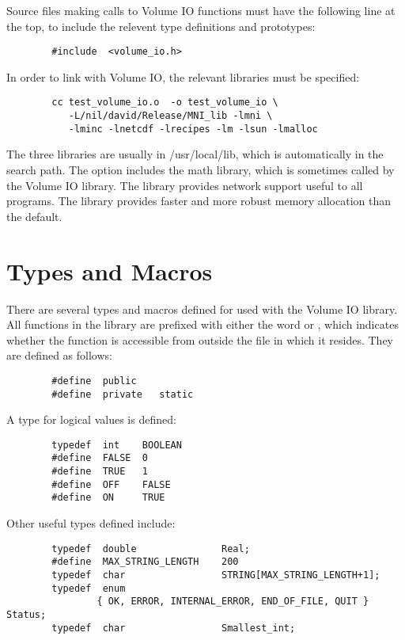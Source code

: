 Source files making calls to Volume IO functions must have the
following line at the top, to include the relevent type definitions and
prototypes:

\begin{verbatim}
        #include  <volume_io.h>
\end{verbatim}

In order to link with Volume IO, the relevant libraries must be
specified:
\begin{verbatim}
        cc test_volume_io.o  -o test_volume_io \
           -L/nil/david/Release/MNI_lib -lmni \
           -lminc -lnetcdf -lrecipes -lm -lsun -lmalloc
\end{verbatim}
The three libraries are usually in /usr/local/lib, which is
automatically in the search path.  The  option includes the
math library, which is sometimes called by the Volume IO library.  The
\name{-lsun} library provides network support useful to all programs.
The \name{-lmalloc} library provides faster and more robust memory
allocation than the default.

\section{Types and Macros}

There are several types and macros defined for used with the Volume IO
library.  All functions in the library are prefixed with either the
word \name{public} or \name{private}, which indicates whether the
function is accessible from outside the file in which it resides.
They are defined as follows:
\begin{verbatim}
        #define  public
        #define  private   static
\end{verbatim}

A type for logical values is defined:
\begin{verbatim}
        typedef  int    BOOLEAN
        #define  FALSE  0
        #define  TRUE   1
        #define  OFF    FALSE
        #define  ON     TRUE
\end{verbatim}

Other useful types defined include:
\begin{verbatim}
        typedef  double               Real;
        #define  MAX_STRING_LENGTH    200
        typedef  char                 STRING[MAX_STRING_LENGTH+1];
        typedef  enum 
                { OK, ERROR, INTERNAL_ERROR, END_OF_FILE, QUIT } Status;
        typedef  char                 Smallest_int;
\end{verbatim}

